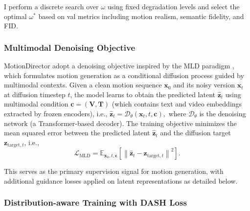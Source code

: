 \documentclass[a4paper,12pt]{article}
\begin{document}
I perform a discrete search over $\omega$ using fixed degradation levels and select the optimal $\omega^*$ based on val metrics including motion realism, semantic fidelity, and FID.

\subsubsection{Multimodal Denoising Objective}

MotionDirector adopt a denoising objective inspired by the MLD paradigm \cite{chen2023executing}, which formulates motion generation as a conditional diffusion process guided by multimodal contexts. Given a clean motion sequence $\mathbf{x}_0$ and its noisy version $\mathbf{x}_t$ at diffusion timestep $t$, the model learns to obtain the predicted latent $\hat{\mathbf{z}}_t$ using multimodal condition $\mathbf{c} = (\mathbf{V}, \mathbf{T})$ (which contains text and video embeddings extracted by frozen encoders), i.e.,
$
\hat{\mathbf{z}}_t = \mathcal{D}_\theta(\mathbf{x}_t, t, \mathbf{c}),
$
where $\mathcal{D}_\theta$ is the denoising network (a Transformer-based decoder).
%
The training objective minimizes the mean squared error between the predicted latent $\hat{\mathbf{z}}_t$ and the diffusion target  $\mathbf{z}_{\text{target},t}$, i.e.,
\begin{equation}
\mathcal{L}_{\text{MLD}} = \mathbb{E}_{\mathbf{x}_0, t, \boldsymbol{\epsilon}} \left[ \left\| \hat{\mathbf{z}}_t - \mathbf{z}_{\text{target},t} \right\|^2 \right].
\end{equation}

This serves as the primary supervision signal for motion generation, with additional guidance losses applied on latent representations as detailed below.

\subsubsection{Distribution-aware Training with DASH Loss}
\end{document}
